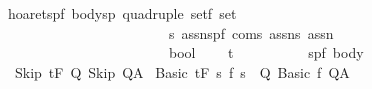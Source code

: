\begin{isabellebody}
{}
\isamarkuptrue%
\isamarkupfalse%
\ {\isachardoublequoteopen}hoaret{\isachardoublequoteclose}{\isacharcolon}{\isacharcolon}{\isachardoublequoteopen}{\isacharbrackleft}{\isacharparenleft}{\isacharprime}s{\isacharcomma}{\isacharprime}p{\isacharcomma}{\isacharprime}f{\isacharparenright}\ body{\isacharcomma}{\isacharparenleft}{\isacharprime}s{\isacharcomma}{\isacharprime}p{\isacharparenright}\ quadruple\ set{\isacharcomma}{\isacharprime}f\ set{\isacharcomma}\isanewline
\ \ \ \ \ \ \ \ \ \ \ \ \ \ \ \ \ \ \ \ \ \ \ \ {\isacharprime}s\ assn{\isacharcomma}{\isacharparenleft}{\isacharprime}s{\isacharcomma}{\isacharprime}p{\isacharcomma}{\isacharprime}f{\isacharparenright}\ com{\isacharcomma}{\isacharprime}s\ assn{\isacharcomma}{\isacharprime}s\ assn{\isacharbrackright}\ \isanewline
\ \ \ \ \ \ \ \ \ \ \ \ \ \ \ \ \ \ \ \ \ \ \ {\isacharequal}{\isachargreater}\ bool{\isachardoublequoteclose}\isanewline
\ \ \ \ {\isacharparenleft}{\isachardoublequoteopen}{\isacharparenleft}{}{\isacharunderscore}{\isacharcomma}{\isacharunderscore}{\isacharslash}{\isasymturnstile}\isactrlsub t\isactrlbsub {\isacharprime}{\isacharslash}{\isacharunderscore}\isactrlesub \ {\isacharparenleft}{\isacharunderscore}{\isacharslash}\ {\isacharparenleft}{\isacharunderscore}{\isacharparenright}{\isacharslash}\ {\isacharunderscore}{\isacharcomma}{\isacharunderscore}{\isacharparenright}{\isacharparenright}{\isachardoublequoteclose}\ {\isacharbrackleft}{}{}{\isacharcomma}{}{}{\isacharcomma}{}{}{\isacharcomma}{}{}{}{}{\isacharcomma}{}{}{\isacharcomma}{}{}{}{}{\isacharcomma}{}{}{}{}{\isacharbrackright}{}{}{\isacharparenright}\ \ \isanewline
\ \ \ \ {\isasymGamma}{\isacharcolon}{\isacharcolon}{\isachardoublequoteopen}{\isacharparenleft}{\isacharprime}s{\isacharcomma}{\isacharprime}p{\isacharcomma}{\isacharprime}f{\isacharparenright}\ body{\isachardoublequoteclose}\isanewline
{}\isanewline
\ \ Skip{\isacharcolon}\ {\isachardoublequoteopen}{\isasymGamma}{\isacharcomma}{\isasymTheta}{\isasymturnstile}\isactrlsub t\isactrlbsub {\isacharslash}F\isactrlesub \ Q\ Skip\ Q{\isacharcomma}A{\isachardoublequoteclose}\isanewline
\isanewline
{\isacharbar}\ Basic{\isacharcolon}\ {\isachardoublequoteopen}{\isasymGamma}{\isacharcomma}{\isasymTheta}{\isasymturnstile}\isactrlsub t\isactrlbsub {\isacharslash}F\isactrlesub \ {\isacharbraceleft}s{\isachardot}\ f\ s\ {\isasymin}\ Q{\isacharbraceright}\ {\isacharparenleft}Basic\ f{\isacharparenright}\ Q{\isacharcomma}A{\isachardoublequoteclose}\isanewline

\end{isabellebody}
